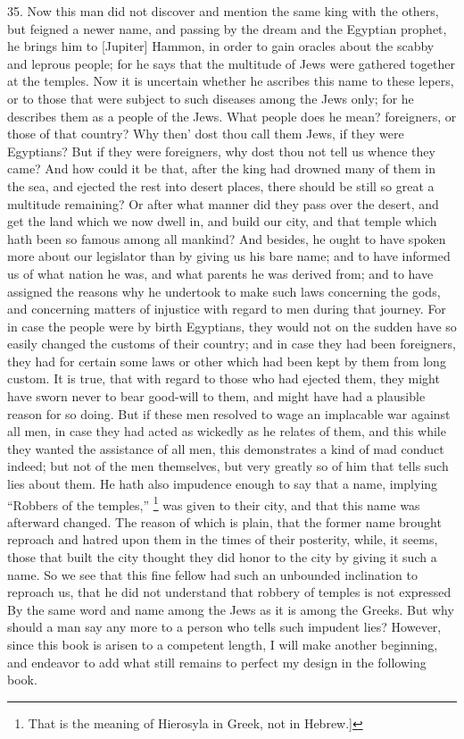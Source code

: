 35. Now this man did not discover and mention the same king with the
others, but feigned a newer name, and passing by the dream and the
Egyptian prophet, he brings him to [Jupiter] Hammon, in order to gain
oracles about the scabby and leprous people; for he says that the
multitude of Jews were gathered together at the temples. Now it is
uncertain whether he ascribes this name to these lepers, or to those that
were subject to such diseases among the Jews only; for he describes them
as a people of the Jews. What people does he mean? foreigners, or those of
that country? Why then' dost thou call them Jews, if they were Egyptians?
But if they were foreigners, why dost thou not tell us whence they came?
And how could it be that, after the king had drowned many of them in the
sea, and ejected the rest into desert places, there should be still so
great a multitude remaining? Or after what manner did they pass over the
desert, and get the land which we now dwell in, and build our city, and
that temple which hath been so famous among all mankind? And besides, he
ought to have spoken more about our legislator than by giving us his bare
name; and to have informed us of what nation he was, and what parents he
was derived from; and to have assigned the reasons why he undertook to
make such laws concerning the gods, and concerning matters of injustice
with regard to men during that journey. For in case the people were by
birth Egyptians, they would not on the sudden have so easily changed the
customs of their country; and in case they had been foreigners, they had
for certain some laws or other which had been kept by them from long
custom. It is true, that with regard to those who had ejected them, they
might have sworn never to bear good-will to them, and might have had a
plausible reason for so doing. But if these men resolved to wage an
implacable war against all men, in case they had acted as wickedly as he
relates of them, and this while they wanted the assistance of all men,
this demonstrates a kind of mad conduct indeed; but not of the men
themselves, but very greatly so of him that tells such lies about them. He
hath also impudence enough to say that a name, implying ``Robbers of the
temples,'' \footnote{That is the meaning of
Hierosyla in Greek, not in Hebrew.]}
was given to their city, and that this name was afterward changed. The
reason of which is plain, that the former name brought reproach and hatred
upon them in the times of their posterity, while, it seems, those that
built the city thought they did honor to the city by giving it such a
name. So we see that this fine fellow had such an unbounded inclination to
reproach us, that he did not understand that robbery of temples is not
expressed By the same word and name among the Jews as it is among the
Greeks. But why should a man say any more to a person who tells such
impudent lies? However, since this book is arisen to a competent length, I
will make another beginning, and endeavor to add what still remains to
perfect my design in the following book.

